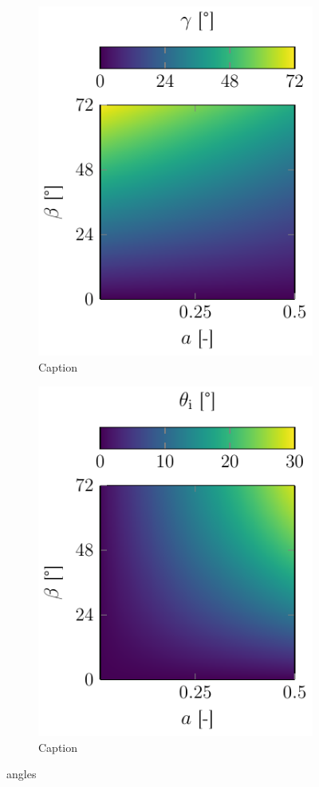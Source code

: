 \lipsum[1-2]

\begin{figure}
  \centering
  \begin{subfigure}[b]{0.45\textwidth}
    \centering
    \includegraphics[]{Plots/cache/gamma.pdf}
    \caption{Caption}
    \label{fig:Th-gamma}
  \end{subfigure}
  \hfill
  \begin{subfigure}[b]{0.45\textwidth}
    \centering
    \includegraphics[]{Plots/cache/theta_i.pdf}
    \caption{Caption}
    \label{fig:Th-theta_i}
  \end{subfigure}
  \caption{angles}
  \label{fig:Th-gamma_theta}
\end{figure}

